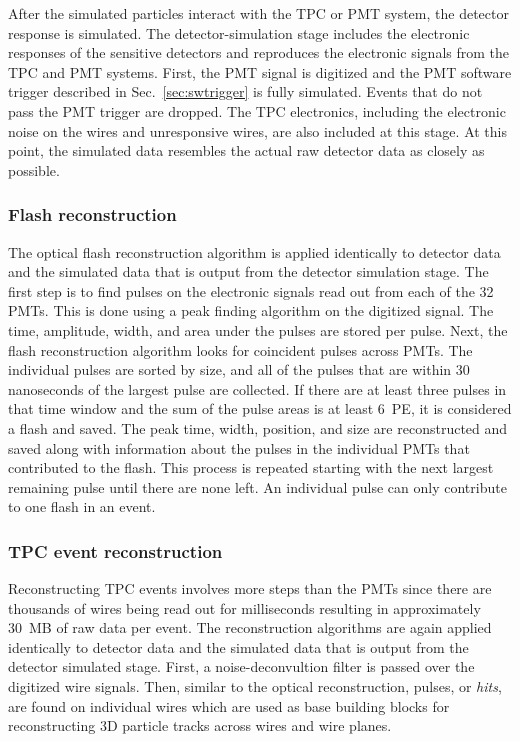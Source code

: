     After the simulated particles interact with the TPC or PMT system, the
    detector response is simulated. The detector-simulation stage includes the
    electronic responses of the sensitive detectors and reproduces the
    electronic signals from the TPC and PMT systems. First, the PMT signal is
    digitized and the PMT software trigger described in
    Sec.~\ref{sec:swtrigger} is fully simulated. Events that do not pass the
    PMT trigger are dropped. The TPC electronics, including the electronic
    noise on the wires and unresponsive wires, are also included at this stage.
    At this point, the simulated data resembles the actual raw detector data as
    closely as possible.

  \subsubsection{Flash reconstruction}
    The optical flash reconstruction algorithm is applied identically to
    detector data and the simulated data that is output from the detector
    simulation stage.  The first step is to find pulses on the electronic
    signals read out from each of the 32 PMTs. This is done using a peak
    finding algorithm on the digitized signal. The time, amplitude, width, and
    area under the pulses are stored per pulse. Next, the flash reconstruction
    algorithm looks for coincident pulses across PMTs. The individual pulses
    are sorted by size, and all of the pulses that are within 30 nanoseconds of
    the largest pulse are collected. If there are at least three pulses in that
    time window and the sum of the pulse areas is at least 6~PE, it is considered a
    flash and saved. The peak time, width, position, and size are reconstructed
    and saved along with information about the pulses in the individual PMTs
    that contributed to the flash. This process is repeated starting with the
    next largest remaining pulse until there are none left. An individual pulse
    can only contribute to one flash in an event.

  \subsubsection{TPC event reconstruction}
    Reconstructing TPC events involves more steps than the PMTs since there are
    thousands of wires being read out for milliseconds resulting in
    approximately 30~MB of raw data per event. The reconstruction algorithms
    are again applied identically to detector data and the simulated data that
    is output from the detector simulated stage. First, a noise-deconvultion
    filter is passed over the digitized wire signals. Then, similar to the
    optical reconstruction, pulses, or \textit{hits}, are found on individual
    wires which are used as base building blocks for reconstructing 3D particle
    tracks across wires and wire planes.

